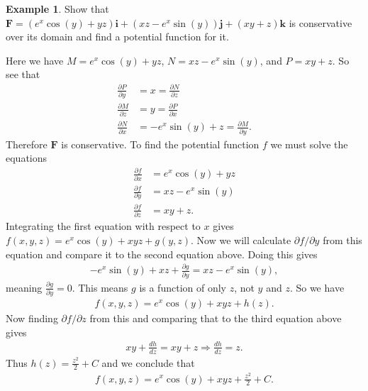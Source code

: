 \documentclass[12pt, letter]{article}
\theoremstyle{plain}
\numberwithin{theorem}{section}
\theoremstyle{definition}
\newtheorem{example}[theorem]{Example}
\begin{document}
\begin{example}
Show that $\bm{F}=(e^x\cos(y)+yz)\bm{i}+(xz-e^x\sin(y))\bm{j}+(xy+z)\bm{k}$ is conservative over its domain and find a potential function for it.

\bigskip

Here we have $M=e^x\cos(y)+yz$, $N=xz-e^x\sin(y)$, and $P=xy+z$. So see that
\begin{align*}
\frac{\partial P}{\partial y} &= x = \frac{\partial N}{\partial z}\\
\frac{\partial M}{\partial z} &= y = \frac{\partial P}{\partial x}\\
\frac{\partial N}{\partial x} &= -e^x\sin(y)+z = \frac{\partial M}{\partial y}.
\end{align*}
Therefore $\bm{F}$ is conservative. To find the potential function $f$ we must solve the equations
\begin{align*}
\frac{\partial f}{\partial x} &= e^x\cos(y)+yz\\
\frac{\partial f}{\partial y} &= xz-e^x\sin(y)\\
\frac{\partial f}{\partial z} &= xy+z.
\end{align*}
Integrating the first equation with respect to $x$ gives $f(x,y,z) = e^x\cos(y)+xyz+g(y,z)$. Now we will calculate $\partial f/\partial y$ from this equation and compare it to the second equation above. Doing this gives
\begin{align*}
-e^x\sin(y)+xz+\frac{\partial g}{\partial y} = xz-e^x\sin(y),
\end{align*}
meaning $\frac{\partial g}{\partial y}=0$. This means $g$ is a function of only $z$, not $y$ and $z$. So we have
\begin{align*}
f(x,y,z) = e^x\cos(y)+xyz+h(z).
\end{align*}
Now finding $\partial f/\partial z$ from this and comparing that to the third equation above gives
\begin{align*}
xy+\frac{dh}{dz} = xy+z \Rightarrow \frac{dh}{dz}=z.
\end{align*}
Thus $h(z) = \frac{z^2}{2}+C$ and we conclude that
\begin{align*}
f(x,y,z) = e^x\cos(y)+xyz+\frac{z^2}{2}+C.
\end{align*}
\end{example}

\newpage

\end{document}
